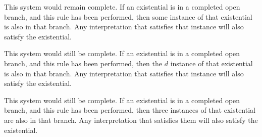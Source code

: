 \begin{earg}




\item This system would remain complete. If an existential is in a completed open branch, and this rule has been performed, then some instance of that existential is also in that branch. Any interpretation that satisfies that instance will also satisfy the existential.

\item This system would still be complete. If an existential is in a completed open branch, and this rule has been performed, then the $d$ instance of that existential is also in that branch. Any interpretation that satisfies that instance will also satisfy the existential.

%

\item This system would still be complete. If an existential is in a completed open branch, and this rule has been performed, then three instances of that existential are also in that branch. Any interpretation that satisfies them will also satisfy the existential.


\end{earg}

